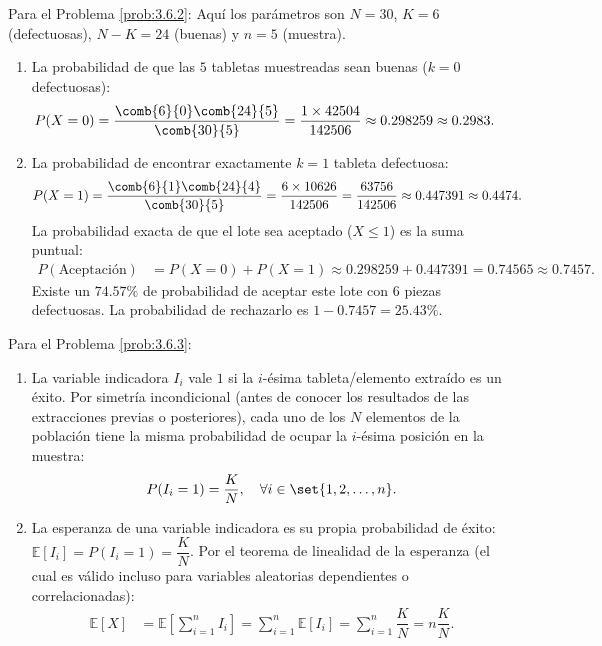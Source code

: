\begin{solucion}
	\label{sol:3.6.2}
	Para el Problema \ref{prob:3.6.2}:
	Aquí los parámetros son $N=30$, $K=6$ (defectuosas), $N-K=24$ (buenas) y $n=5$ (muestra).
	\begin{enumerate}
		\item La probabilidad de que las $5$ tabletas muestreadas sean buenas ($k=0$ defectuosas):
		\begin{align*}
			P(X = 0) &= \dfrac{\comb{6}{0}\comb{24}{5}}{\comb{30}{5}} = \dfrac{1 \times 42504}{142506} \approx 0.298259 \approx 0.2983.
		\end{align*}
		\item La probabilidad de encontrar exactamente $k=1$ tableta defectuosa:
		\begin{align*}
			P(X = 1) &= \dfrac{\comb{6}{1}\comb{24}{4}}{\comb{30}{5}} = \dfrac{6 \times 10626}{142506} = \dfrac{63756}{142506} \approx 0.447391 \approx 0.4474.
		\end{align*}
		La probabilidad exacta de que el lote sea aceptado ($X \le 1$) es la suma puntual:
		\begin{align*}
			P(\text{Aceptación}) &= P(X = 0) + P(X = 1) \approx 0.298259 + 0.447391 = 0.74565 \approx 0.7457.
		\end{align*}
		Existe un $74.57\%$ de probabilidad de aceptar este lote con 6 piezas defectuosas. La probabilidad de rechazarlo es $1 - 0.7457 = 25.43\%$.
	\end{enumerate}
\end{solucion}

\begin{solucion}
	\label{sol:3.6.3}
	Para el Problema \ref{prob:3.6.3}:
	\begin{enumerate}
		\item La variable indicadora $I_i$ vale $1$ si la $i$-ésima tableta/elemento extraído es un éxito. Por simetría incondicional (antes de conocer los resultados de las extracciones previas o posteriores), cada uno de los $N$ elementos de la población tiene la misma probabilidad de ocupar la $i$-ésima posición en la muestra:
		\begin{align*}
			P(I_i = 1) = \dfrac{K}{N}, \quad \forall i \in \set{1, 2, \dots, n}.
		\end{align*}
		\item La esperanza de una variable indicadora es su propia probabilidad de éxito: $\mathbb{E}[I_i] = P(I_i = 1) = \dfrac{K}{N}$. Por el teorema de linealidad de la esperanza (el cual es válido incluso para variables aleatorias dependientes o correlacionadas):
		\begin{align*}
			\mathbb{E}[X] &= \mathbb{E}\left[\sum_{i=1}^n I_i\right] = \sum_{i=1}^n \mathbb{E}[I_i] = \sum_{i=1}^n \dfrac{K}{N} = n \dfrac{K}{N}.
		\end{align*}
	\end{enumerate}
\end{solucion}

